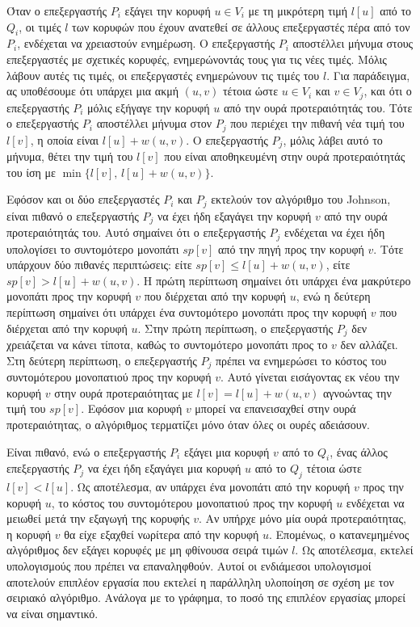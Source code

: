 \documentclass[12pt,a4paper]{article} %
\begin{document}
{{Όταν ο επεξεργαστής $P_i$ εξάγει την κορυφή $u \in V_i$ με τη μικρότερη
τιμή $l[u]$ από το $Q_i$, οι τιμές $l$ των κορυφών που έχουν ανατεθεί σε
άλλους επεξεργαστές πέρα από τον $P_i$, ενδέχεται να χρειαστούν ενημέρωση. Ο επεξεργαστής
$P_i$ αποστέλλει μήνυμα στους επεξεργαστές με σχετικές κορυφές,
ενημερώνοντάς τους για τις νέες τιμές. Μόλις λάβουν αυτές τις τιμές,
οι επεξεργαστές ενημερώνουν τις τιμές του $l$. Για παράδειγμα, ας
υποθέσουμε ότι υπάρχει μια ακμή $(u, v)$ τέτοια ώστε $u \in V_i$ και
$v \in V_j$, και ότι ο επεξεργαστής $P_i$ μόλις εξήγαγε την κορυφή $u$
από την ουρά προτεραιότητάς του. Τότε ο επεξεργαστής $P_i$ αποστέλλει
μήνυμα στον $P_j$ που περιέχει την πιθανή νέα τιμή του $l[v]$, η οποία
είναι $l[u] + w(u, v)$. Ο επεξεργαστής $P_j$, μόλις λάβει αυτό το
μήνυμα, θέτει την τιμή του $l[v]$ που είναι αποθηκευμένη στην ουρά
προτεραιότητάς του ίση με $\min\{l[v],\, l[u] + w(u, v)\}$.

Εφόσον και οι δύο επεξεργαστές $P_i$ και $P_j$ εκτελούν τον αλγόριθμο
του Johnson, είναι πιθανό ο επεξεργαστής $P_j$ να έχει ήδη εξαγάγει
την κορυφή $v$ από την ουρά προτεραιότητάς του. Αυτό σημαίνει ότι ο
επεξεργαστής $P_j$ ενδέχεται να έχει ήδη υπολογίσει το συντομότερο
μονοπάτι $sp[v]$ από την πηγή προς την κορυφή $v$. Τότε υπάρχουν δύο
πιθανές περιπτώσεις: είτε $sp[v] \leq l[u] + w(u, v)$, είτε $sp[v] >
l[u] + w(u, v)$. Η πρώτη περίπτωση σημαίνει ότι υπάρχει ένα μακρύτερο
μονοπάτι προς την κορυφή $v$ που διέρχεται από την κορυφή $u$, ενώ η
δεύτερη περίπτωση σημαίνει ότι υπάρχει ένα συντομότερο μονοπάτι προς
την κορυφή $v$ που διέρχεται από την κορυφή $u$. Στην πρώτη περίπτωση,
ο επεξεργαστής $P_j$ δεν χρειάζεται να κάνει τίποτα, καθώς το
συντομότερο μονοπάτι προς το $v$ δεν αλλάζει. Στη δεύτερη περίπτωση,
ο επεξεργαστής $P_j$ πρέπει να ενημερώσει το κόστος του συντομότερου
μονοπατιού προς την κορυφή $v$. Αυτό γίνεται εισάγοντας εκ νέου την
κορυφή $v$ στην ουρά προτεραιότητας με $l[v] = l[u] + w(u, v)$ 
αγνοώντας την τιμή του $sp[v]$. Εφόσον μια
κορυφή $v$ μπορεί να επανεισαχθεί στην ουρά προτεραιότητας, ο
αλγόριθμος τερματίζει μόνο όταν όλες οι ουρές αδειάσουν.

Είναι πιθανό, ενώ ο επεξεργαστής $P_i$ εξάγει μια κορυφή $v$ από το
$Q_i$, ένας άλλος επεξεργαστής $P_j$ να έχει ήδη εξαγάγει μια κορυφή
$u$ από το $Q_j$ τέτοια ώστε $l[v] < l[u]$. Ως αποτέλεσμα, αν υπάρχει
ένα μονοπάτι από την κορυφή $v$ προς την κορυφή $u$, το κόστος του
συντομότερου μονοπατιού προς την κορυφή $u$ ενδέχεται να μειωθεί μετά
την εξαγωγή της κορυφής $v$. Αν υπήρχε μόνο μία ουρά προτεραιότητας,
η κορυφή $v$ θα είχε εξαχθεί νωρίτερα από την κορυφή $u$. Επομένως,
ο κατανεμημένος αλγόριθμος δεν εξάγει κορυφές με μη φθίνουσα σειρά
τιμών $l$. Ως αποτέλεσμα, εκτελεί υπολογισμούς που πρέπει να
επαναληφθούν. Αυτοί οι ενδιάμεσοι υπολογισμοί αποτελούν επιπλέον
εργασία που εκτελεί η παράλληλη υλοποίηση σε σχέση με τον σειριακό
αλγόριθμο. Ανάλογα με το γράφημα, το ποσό της επιπλέον εργασίας μπορεί
να είναι σημαντικό.

}}
\end{document}
